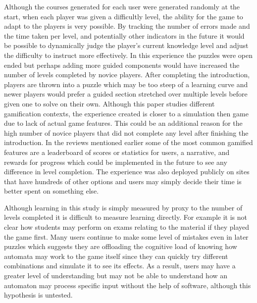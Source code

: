 \documentclass[letterpaper,man,natbib,floatsintext]{apa7}  %
\begin{document}
Although the courses generated for each user were generated randomly at the start, when each player was given a difficultly level, the ability for the game to adapt to the players is very possible. By tracking the number of errors made and the time taken per level, and potentially other indicators in the future it would be possible to dynamically 
judge the player's current knowledge level and adjust the difficulty to instruct more effectively. In this experience 
the puzzles were open ended but perhaps adding more guided components would have increased the number of levels completed
by novice players. After completing the introduction, players are thrown into a puzzle which may be too steep of a learning curve and newer players would prefer a guided section stretched over multiple levels before given one to solve on their own. Although this paper studies different gamification contexts, the experience created is closer to a simulation then game due to lack of actual game features. This could be an additional reason for the high number of novice
players that did not complete any level after finishing the introduction. In the reviews mentioned earlier some of the most common gamified features are a leaderboard of scores or statistics for users, a narrative, and rewards for progress which could be implemented in the future to see any difference in level completion. The experience was also deployed publicly on sites that have hundreds of other options and users may simply decide their time is better spent on something else.

Although learning in this study is simply measured by proxy to the number of levels completed it is difficult to measure learning directly. For example it is not clear how students may perform on exams relating to the material if they 
played the game first. Many users continue to make some level of mistakes even in later puzzles which suggests they 
are offloading the cognitive load of knowing how automata may work to the game itself since they can quickly 
try different combinations and simulate it to see its effects. As a result, users may have a greater level of
understanding but may not be able to understand how an automaton may process specific input without the help of software, although this hypothesis is untested.
\end{document}
